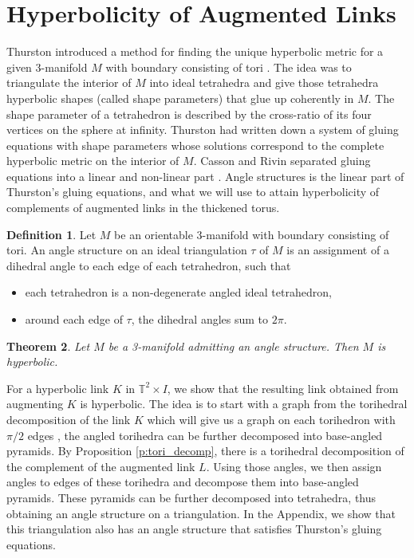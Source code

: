\documentclass[11pt]{amsart}
\newcommand{\prpref}[1]{Proposition \ref{#1}}
\newcommand{\torus}{{\mathbb{T}^2}}
\theoremstyle{plain}
\newtheorem{theorem}{Theorem}[section]
\theoremstyle{definition}
\newtheorem{define}[theorem]{Definition}
\begin{document}
\section{Hyperbolicity of Augmented Links}
\label{s:hyperbolicity}
Thurston introduced a method for finding the unique hyperbolic metric for a
given 3-manifold $M$ with boundary consisting of tori \cite{Thurston}. The idea
was to triangulate the interior of $M$ into ideal tetrahedra and give those
tetrahedra hyperbolic shapes (called shape parameters) that glue up coherently
in $M$. The shape parameter of a tetrahedron is described by the cross-ratio of
its four vertices on the sphere at infinity. Thurston had written down a system
of gluing equations with shape parameters whose solutions correspond to the
complete hyperbolic metric on the interior of $M$. Casson and Rivin separated
gluing equations into a linear and non-linear part \cite{Casson-Rivin}. Angle
structures is the linear part of Thurston's gluing equations, and what we will
use to attain hyperbolicity of complements of augmented links in the thickened
torus.


\begin{define}
Let $M$ be an orientable 3-manifold with boundary consisting of tori. An angle
structure on an ideal triangulation $\tau$ of $M$ is an assignment of a dihedral
angle to each edge of each tetrahedron, such that
\begin{itemize}
\item each tetrahedron is a non-degenerate angled ideal tetrahedron,
\item around each edge of $\tau$, the dihedral angles sum to $2\pi$.
\end{itemize}
\end{define}

\begin{theorem}\cite{Casson-Rivin}\label{thm:Casson-Rivin}
Let $M$ be a 3-manifold admitting an angle structure. Then $M$ is hyperbolic.
\end{theorem}

For a hyperbolic link $K$ in $\torus \times I$, we show
that the resulting link obtained from augmenting $K$ is
hyperbolic. The idea is to start with a graph from the torihedral decomposition
of the link $K$ which will give us a graph on each torihedron with $\pi/2$ edges
\cite{CKP2},
the angled torihedra can be further decomposed into base-angled pyramids.
By \prpref{p:tori_decomp},
there is a torihedral decomposition of the complement of the augmented link $L$.
Using those angles,
we then assign angles to edges of these torihedra
and decompose them into base-angled pyramids.
These pyramids can be further decomposed into tetrahedra,
thus obtaining an angle structure on a triangulation.
In the Appendix, we show that this triangulation
also has an angle structure that
satisfies Thurston's gluing equations.
\end{document}
